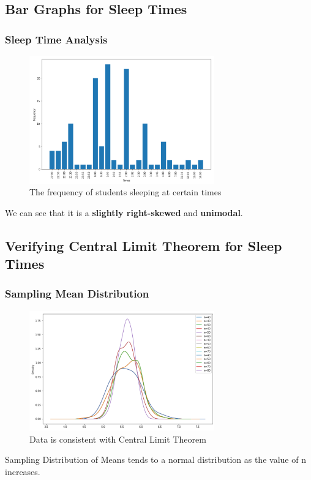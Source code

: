 \documentclass[11pt,]{beamer}
\begin{document}
\subsection{Bar Graphs for Sleep Times}

\begin{frame}
    
    \frametitle{Sleep Time Analysis}

    \begin{figure}
    	\includegraphics[width=8cm]{Sleep_Times.png}
    	\caption{The frequency of students sleeping at certain times}
    \end{figure}
    
    We can see that it is a \textbf{slightly right-skewed} and \textbf{unimodal}.

\end{frame}

\subsection{Verifying Central Limit Theorem for Sleep Times}

\begin{frame}

    \frametitle{Sampling Mean Distribution}
        
        \begin{figure}
		\includegraphics[width=8cm]{Sleep_Times_CLT.png}
		\caption{Data is consistent with Central Limit Theorem}
	\end{figure}
	
	Sampling Distribution of Means tends to a normal distribution as
    the value of n increases. 
    
\end{frame}
\end{document}
